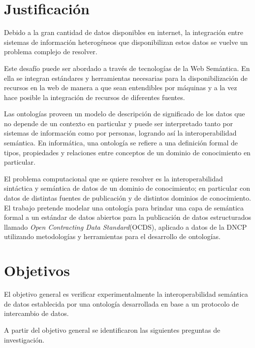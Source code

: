 \section{Justificación}

Debido a la gran cantidad de datos disponibles en internet, la integración entre sistemas de información heterogéneos que disponibilizan estos datos se vuelve un problema complejo de resolver. 

Este desafío puede ser abordado a través de tecnologías de la Web Semántica. En ella se integran estándares y herramientas necesarias para la disponibilización de recursos en la web de manera a que sean entendibles por máquinas y a la vez hace posible la integración de recursos de diferentes fuentes. 

Las ontologías proveen un modelo de descripción de significado de los datos que no depende de un contexto en particular y puede ser interpretado tanto por sistemas de información como por personas, logrando así la interoperabilidad semántica. En informática, una ontología se refiere a una definición formal de tipos, propiedades y relaciones entre conceptos de un dominio de conocimiento en particular.

El problema computacional que se quiere resolver es la interoperabilidad sintáctica y semántica de datos de un dominio de conocimiento; en particular con datos de distintas fuentes de publicación y de distintos dominios de conocimiento. El trabajo pretende modelar una ontología para brindar una capa de semántica formal a un estándar de datos abiertos para la publicación de datos estructurados llamado \textit{Open Contracting Data Standard}(OCDS), aplicado a datos de la DNCP utilizando metodologías y herramientas para el desarrollo de ontologías. 


\section{Objetivos}

El objetivo general es verificar experimentalmente la interoperabilidad semántica de datos establecida por una ontología desarrollada en base a un protocolo de intercambio de datos.

A partir del objetivo general se identificaron las siguientes preguntas de investigación.

